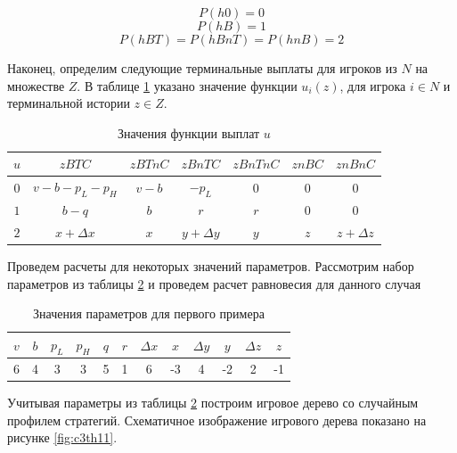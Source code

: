 $$P(h0) = 0$$
$$P(hB)=1$$
$$P(hBT)=P(hBnT)=P(hnB)=2$$

Наконец, определим следующие терминальные выплаты для игроков из $N$ на множестве $Z$. В таблице \ref{tbl:u1} указано значение функции $u_i(z)$, для игрока $i \in N$ и терминальной истории $z \in Z$.

\begin{table}[H]
	\centering
	\begin{tabular}[t]{|c|c|c|c|c|c|c|}
		\hline
		$u$ &	$zBTC$ & $zBTnC$ &	$zBnTC$ & $zBnTnC$ & $znBC$ & $znBnC$ \\
		\hline
		$0$	&$v-b-p_L-p_H$&	$v-b$&	$-p_L$&	$0$&	$0$ &	$0$ \\
		\hline
		$1$&	$b-q$&	$b$&	$r$&	$r$&	$0$&	$0$ \\
		\hline
		$2$&	$x+\Delta x$&	$x$&	$y+\Delta y$&	$y$&	$z$&	$z+\Delta z$ \\
		
		\hline
	\end{tabular}
	\caption{\centering Значения функции выплат $u$}
	\label{tbl:u1}
\end{table}

Проведем расчеты для некоторых значений параметров. Рассмотрим набор параметров из таблицы \ref{tbl:s1_1} и проведем расчет равновесия для данного случая

\begin{table}[H]
	\centering
	\begin{tabular}[t]{|c|c|c|c|c|c|c|c|c|c|c|c|}
		\hline
		$v$ &	$b$ & $p_L$ &	$p_H$ & $q$ & $r$ & $\Delta x$ & $x$ & $\Delta y$ & $y$ & $\Delta z$ & $z$ \\
		\hline
		6 &	4 & 3 &	3 & 5 & 1 & 6 & -3 & 4 & -2 & 2 & -1 \\
		\hline
	\end{tabular}
\caption{\centering Значения параметров для первого примера}
\label{tbl:s1_1}
\end{table}
\par
Учитывая параметры из таблицы \ref{tbl:s1_1} построим игровое дерево со случайным профилем стратегий. Схематичное изображение игрового дерева показано на рисунке \ref{fig:c3th11}.

